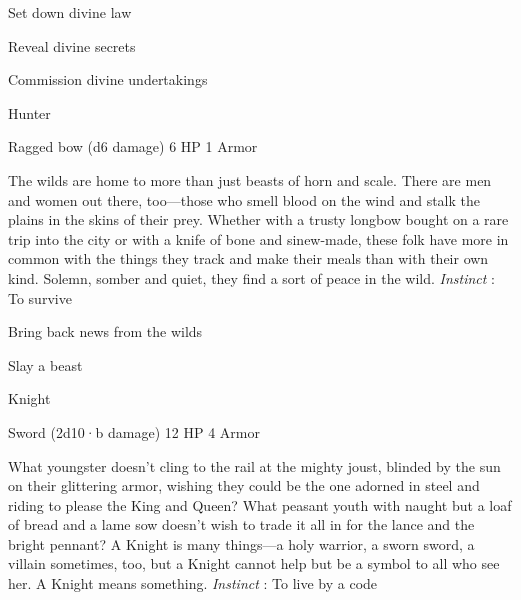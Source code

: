 \startitemize[1,packed]
         
\item Set down divine law

         
\item Reveal divine secrets

         
\item Commission divine undertakings

       
\stopitemize
       
\startMonsterName
Hunter	 
\stopMonsterName
       

Ragged bow (d6 damage)	6 HP	1 Armor

       


       
\startMonsterDescription
The wilds are home to more than just beasts of horn and scale. There are men and women out there, too—those who smell blood on the wind and stalk the plains in the skins of their prey. Whether with a trusty longbow bought on a rare trip into the city or with a knife of bone and sinew-made, these folk have more in common with the things they track and make their meals than with their own kind. Solemn, somber and quiet, they find a sort of peace in the wild. {\em Instinct} : To survive
\stopMonsterDescription
       
\startitemize[1,packed]
         
\item Bring back news from the wilds

         
\item Slay a beast

       
\stopitemize
       
\startMonsterName
Knight	 
\stopMonsterName
       

Sword (2d10·b damage)	12 HP	4 Armor

       


       
\startMonsterDescription
What youngster doesn’t cling to the rail at the mighty joust, blinded by the sun on their glittering armor, wishing they could be the one adorned in steel and riding to please the King and Queen? What peasant youth with naught but a loaf of bread and a lame sow doesn’t wish to trade it all in for the lance and the bright pennant? A Knight is many things—a holy warrior, a sworn sword, a villain sometimes, too, but a Knight cannot help but be a symbol to all who see her. A Knight means something. {\em Instinct} : To live by a code
\stopMonsterDescription
       
